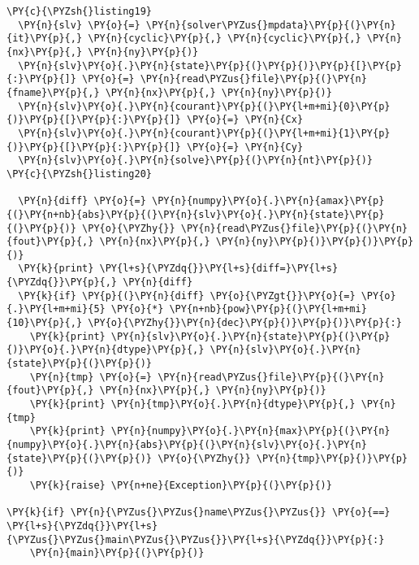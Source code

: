 \begin{Verbatim}[commandchars=\\\{\}]
\PY{c}{\PYZsh{}listing19}
  \PY{n}{slv} \PY{o}{=} \PY{n}{solver\PYZus{}mpdata}\PY{p}{(}\PY{n}{it}\PY{p}{,} \PY{n}{cyclic}\PY{p}{,} \PY{n}{cyclic}\PY{p}{,} \PY{n}{nx}\PY{p}{,} \PY{n}{ny}\PY{p}{)}
  \PY{n}{slv}\PY{o}{.}\PY{n}{state}\PY{p}{(}\PY{p}{)}\PY{p}{[}\PY{p}{:}\PY{p}{]} \PY{o}{=} \PY{n}{read\PYZus{}file}\PY{p}{(}\PY{n}{fname}\PY{p}{,} \PY{n}{nx}\PY{p}{,} \PY{n}{ny}\PY{p}{)}
  \PY{n}{slv}\PY{o}{.}\PY{n}{courant}\PY{p}{(}\PY{l+m+mi}{0}\PY{p}{)}\PY{p}{[}\PY{p}{:}\PY{p}{]} \PY{o}{=} \PY{n}{Cx}
  \PY{n}{slv}\PY{o}{.}\PY{n}{courant}\PY{p}{(}\PY{l+m+mi}{1}\PY{p}{)}\PY{p}{[}\PY{p}{:}\PY{p}{]} \PY{o}{=} \PY{n}{Cy}
  \PY{n}{slv}\PY{o}{.}\PY{n}{solve}\PY{p}{(}\PY{n}{nt}\PY{p}{)}
\PY{c}{\PYZsh{}listing20}

  \PY{n}{diff} \PY{o}{=} \PY{n}{numpy}\PY{o}{.}\PY{n}{amax}\PY{p}{(}\PY{n+nb}{abs}\PY{p}{(}\PY{n}{slv}\PY{o}{.}\PY{n}{state}\PY{p}{(}\PY{p}{)} \PY{o}{\PYZhy{}} \PY{n}{read\PYZus{}file}\PY{p}{(}\PY{n}{fout}\PY{p}{,} \PY{n}{nx}\PY{p}{,} \PY{n}{ny}\PY{p}{)}\PY{p}{)}\PY{p}{)}
  \PY{k}{print} \PY{l+s}{\PYZdq{}}\PY{l+s}{diff=}\PY{l+s}{\PYZdq{}}\PY{p}{,} \PY{n}{diff}
  \PY{k}{if} \PY{p}{(}\PY{n}{diff} \PY{o}{\PYZgt{}}\PY{o}{=} \PY{o}{.}\PY{l+m+mi}{5} \PY{o}{*} \PY{n+nb}{pow}\PY{p}{(}\PY{l+m+mi}{10}\PY{p}{,} \PY{o}{\PYZhy{}}\PY{n}{dec}\PY{p}{)}\PY{p}{)}\PY{p}{:} 
    \PY{k}{print} \PY{n}{slv}\PY{o}{.}\PY{n}{state}\PY{p}{(}\PY{p}{)}\PY{o}{.}\PY{n}{dtype}\PY{p}{,} \PY{n}{slv}\PY{o}{.}\PY{n}{state}\PY{p}{(}\PY{p}{)}
    \PY{n}{tmp} \PY{o}{=} \PY{n}{read\PYZus{}file}\PY{p}{(}\PY{n}{fout}\PY{p}{,} \PY{n}{nx}\PY{p}{,} \PY{n}{ny}\PY{p}{)}
    \PY{k}{print} \PY{n}{tmp}\PY{o}{.}\PY{n}{dtype}\PY{p}{,} \PY{n}{tmp}
    \PY{k}{print} \PY{n}{numpy}\PY{o}{.}\PY{n}{max}\PY{p}{(}\PY{n}{numpy}\PY{o}{.}\PY{n}{abs}\PY{p}{(}\PY{n}{slv}\PY{o}{.}\PY{n}{state}\PY{p}{(}\PY{p}{)} \PY{o}{\PYZhy{}} \PY{n}{tmp}\PY{p}{)}\PY{p}{)}
    \PY{k}{raise} \PY{n+ne}{Exception}\PY{p}{(}\PY{p}{)}

\PY{k}{if} \PY{n}{\PYZus{}\PYZus{}name\PYZus{}\PYZus{}} \PY{o}{==} \PY{l+s}{\PYZdq{}}\PY{l+s}{\PYZus{}\PYZus{}main\PYZus{}\PYZus{}}\PY{l+s}{\PYZdq{}}\PY{p}{:}
    \PY{n}{main}\PY{p}{(}\PY{p}{)}
\end{Verbatim}
